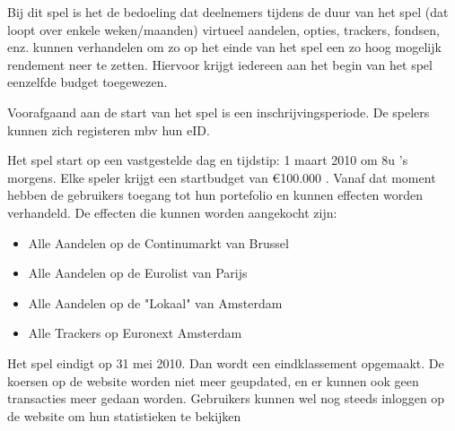 Bij dit spel is het de bedoeling dat deelnemers tijdens de duur van het spel (dat loopt over enkele weken/maanden) virtueel aandelen, opties, trackers, fondsen, enz. kunnen verhandelen om zo op het einde van het spel een zo hoog mogelijk rendement neer te zetten. Hiervoor krijgt iedereen aan het begin van het spel eenzelfde budget toegewezen. 

Voorafgaand aan de start van het spel is een inschrijvingsperiode. De spelers kunnen zich registeren mbv hun eID. 

Het spel start op een vastgestelde dag en tijdstip: 1 maart 2010 om 8u 's morgens. Elke speler krijgt een startbudget van €100.000 .
Vanaf dat moment hebben de gebruikers toegang tot hun portefolio en kunnen effecten worden verhandeld. 
De effecten die kunnen worden aangekocht zijn:
\begin{itemize}
\item{Alle Aandelen op de Continumarkt van Brussel}
\item{Alle Aandelen op de Eurolist van Parijs}
\item{Alle Aandelen op de "Lokaal" van Amsterdam}
\item{Alle Trackers op Euronext Amsterdam}
\end{itemize}

Het spel eindigt op 31 mei 2010. Dan wordt een eindklassement opgemaakt. De koersen op de website worden niet meer geupdated, en er kunnen ook geen transacties meer gedaan worden. Gebruikers kunnen wel nog steeds inloggen op de website om hun statistieken te bekijken
